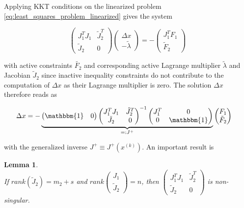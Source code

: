 \documentclass{scrartcl}[12pt, halfparskip]
\numberwithin{equation}{section}
\numberwithin{figure}{section}
\numberwithin{table}{section}
\newtheorem{Lemma}{Lemma}
\begin{document}
Applying KKT conditions on the linearized problem \cref{eq:least_squares_problem_linearized} gives the system

\begin{equation}
	\begin{pmatrix}
		J_1^T J_1 & \tilde{J}_2^T \\
		\tilde{J}_2 & 0
	\end{pmatrix}
	\begin{pmatrix}
		\Delta x \\
		-\tilde{\lambda}
	\end{pmatrix}
	= -
	\begin{pmatrix}
	J_1^T F_1 \\
	\tilde{F}_2
	\end{pmatrix}
	\label{eq:GN_KKT_system}
\end{equation}

with active constraints $\tilde{F_2}$ and corresponding active Lagrange multiplier $\tilde{\lambda}$ and Jacobian $\tilde{J}_2$ since inactive inequality constraints do not contribute to the computation of $\Delta x$ as their Lagrange multiplier is zero. The solution $\Delta x$ therefore reads as

\begin{align}
	\Delta x & =
	- \underbrace{\begin{pmatrix}
		\mathbbm{1} & 0
	\end{pmatrix}
	\begin{pmatrix}
		J_1^T J_1 & \tilde{J}_2^T \\
		\tilde{J}_2 & 0
	\end{pmatrix}^{-1}
	\begin{pmatrix}
		J_1^T & 0 \\
		0 & \mathbbm{1}
	\end{pmatrix}}_{=: J^+}
	\begin{pmatrix}
		F_1 \\
		\tilde{F}_2
	\end{pmatrix}
	\label{eq:GN_solution_formal}
\end{align}

with the generalized inverse $J^+ \equiv J^+(x^{(k)})$. An important result \cite{diss_bock} is

\begin{Lemma} \textcolor{white}{.}\\
	If $rank(\tilde{J}_2) = m_2+s$ and $rank 
	\begin{pmatrix}
	J_1 \\
	\tilde{J}_2
	\end{pmatrix}
	= n$,
	then 	
	$\begin{pmatrix}
		J_1^T J_1 & \tilde{J}_2^T \\
		\tilde{J}_2 & 0
	\end{pmatrix}$
	is non-singular.
\end{Lemma}
\end{document}
